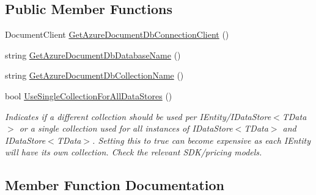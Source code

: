 \subsection*{Public Member Functions}
\begin{DoxyCompactItemize}
\item 
Document\+Client \hyperlink{interfaceCqrs_1_1Azure_1_1DocumentDb_1_1Factories_1_1IAzureDocumentDbDataStoreConnectionStringFactory_ad5207c6dfcb6496aa9fb731b6453a1ee_ad5207c6dfcb6496aa9fb731b6453a1ee}{Get\+Azure\+Document\+Db\+Connection\+Client} ()
\item 
string \hyperlink{interfaceCqrs_1_1Azure_1_1DocumentDb_1_1Factories_1_1IAzureDocumentDbDataStoreConnectionStringFactory_aa5e3d0920e86a97aef18f4f215ce4f88_aa5e3d0920e86a97aef18f4f215ce4f88}{Get\+Azure\+Document\+Db\+Database\+Name} ()
\item 
string \hyperlink{interfaceCqrs_1_1Azure_1_1DocumentDb_1_1Factories_1_1IAzureDocumentDbDataStoreConnectionStringFactory_a0ad3d0046331ea62ea2415f2c0af5675_a0ad3d0046331ea62ea2415f2c0af5675}{Get\+Azure\+Document\+Db\+Collection\+Name} ()
\item 
bool \hyperlink{interfaceCqrs_1_1Azure_1_1DocumentDb_1_1Factories_1_1IAzureDocumentDbDataStoreConnectionStringFactory_ae500b0191fee202806701e4f856c43dd_ae500b0191fee202806701e4f856c43dd}{Use\+Single\+Collection\+For\+All\+Data\+Stores} ()
\begin{DoxyCompactList}\small\item\em Indicates if a different collection should be used per I\+Entity/I\+Data\+Store$<$\+T\+Data$>$ or a single collection used for all instances of I\+Data\+Store$<$\+T\+Data$>$ and I\+Data\+Store$<$\+T\+Data$>$. Setting this to true can become expensive as each I\+Entity will have it\textquotesingle{}s own collection. Check the relevant S\+D\+K/pricing models. \end{DoxyCompactList}\end{DoxyCompactItemize}


\subsection{Member Function Documentation}
\mbox{\label{interfaceCqrs_1_1Azure_1_1DocumentDb_1_1Factories_1_1IAzureDocumentDbDataStoreConnectionStringFactory_a0ad3d0046331ea62ea2415f2c0af5675_a0ad3d0046331ea62ea2415f2c0af5675}} 
